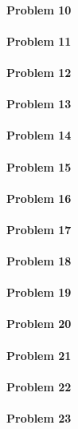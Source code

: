 \paragraph{Problem 10}
\paragraph{Problem 11}
\paragraph{Problem 12}
\paragraph{Problem 13}
\paragraph{Problem 14}
\paragraph{Problem 15}
\paragraph{Problem 16}
\paragraph{Problem 17}
\paragraph{Problem 18}
\paragraph{Problem 19}
\paragraph{Problem 20}
\paragraph{Problem 21}
\paragraph{Problem 22}
\paragraph{Problem 23}
